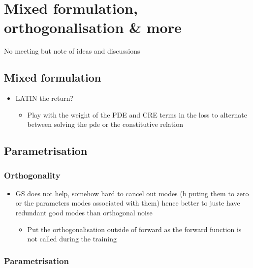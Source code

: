 \chapter[The 5$^{\text{th}}$ of April 2024 - Mixed formulation, orthogonalisation \& mor]{Mixed formulation, orthogonalisation \& more}


\begin{chapabstract}
	No meeting but note of ideas and discussions
\end{chapabstract}


\minitoc

\section{Mixed formulation}

\begin{itemize}
	\item LATIN the return?
	\begin{itemize}
		\item Play with the weight of the PDE and CRE terms in the loss to alternate between solving the pde or the constitutive relation
	\end{itemize}
\end{itemize}

\section{Parametrisation}

\subsection{Orthogonality}
\begin{itemize}
	\item GS does not help, somehow hard to cancel out modes (b puting them to zero or the parameters modes associated with them) hence better to juste have redundant good modes than orthogonal noise
	\begin{itemize}
		\item Put the orthogonalisation outside of forward as the forward function is not called during the training
	\end{itemize}
\end{itemize}

\subsection{Parametrisation}

